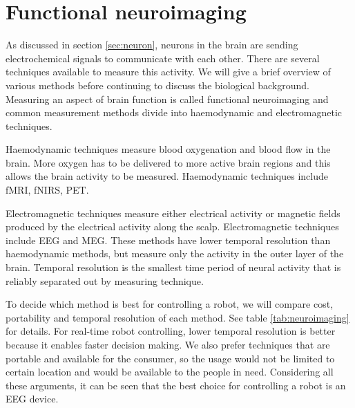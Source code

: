 \section{Functional neuroimaging}
\label{sec:neuroimaging}

As discussed in section \ref{sec:neuron}, neurons in the brain are sending electrochemical signals to communicate with each other. There are several techniques available to measure this activity. We will give a brief overview of various methods before continuing to discuss the biological background. Measuring an aspect of brain function is called functional neuroimaging and common measurement methods divide into haemodynamic and electromagnetic techniques.

Haemodynamic techniques measure blood oxygenation and blood flow in the brain. More oxygen has to be delivered to more active brain regions and this allows the brain activity to be measured. Haemodynamic techniques include \gls{fMRI}, \gls{fNIRS}, \gls{PET}.

Electromagnetic techniques measure either electrical activity or magnetic fields produced by the electrical activity along the scalp. Electromagnetic techniques include \gls{EEG} and \gls{MEG}. These methods have lower temporal resolution than haemodynamic methods, but measure only the activity in the outer layer of the brain. Temporal resolution is the smallest time period of neural activity that is reliably separated out by measuring technique.

To decide which method is best for controlling a robot, we will compare cost, portability and temporal resolution of each method. See table \ref{tab:neuroimaging} for details. For real-time robot controlling, lower temporal resolution is better because it enables faster decision making. We also prefer techniques that are portable and available for the consumer, so the usage would not be limited to certain location and would be available to the people in need. Considering all these arguments, it can be seen that the best choice for controlling a robot is an \gls{EEG} device.


\newcommand{\pMEG}{\tablefootnote{http://neurogadget.com/2012/12/15/inexpensive-magnetoencephalography-meg-system-could-be-available-at-every-hospital/6495}}
\newcommand{\pfMRI}{\tablefootnote{http://info.blockimaging.com/bid/92623/MRI-Machine-Cost-and-Price-Guide}}
\newcommand{\pPET}{\tablefootnote{http://info.blockimaging.com/bid/68875/How-Much-Does-a-PET-CT-Scanner-Cost}}
\newcommand{\pEEG}{\tablefootnote{http://en.wikipedia.org/wiki/Comparison\_of\_consumer\_brain-computer\_interfaces}}
\newcommand{\pNIRS}{\cite{NIRS}}
\newcommand{\tresol}{\cite{timeresol}}

